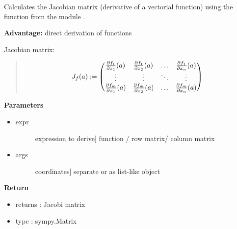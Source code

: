 \documentclass[letterpaper,10pt,english]{sphinxmanual}
\begin{document}
\begin{fulllineitems}
\label{pycontroltools:lietools.lietools.jac}
Calculates the Jacobian matrix (derivative of a vectorial function)
using the  function from the module
.

\textbf{Advantage:} direct derivation of functions

Jacobian matrix:
\begin{quote}
\begin{gather}
\begin{split}J_f(a) :=  \left(\begin{matrix} 
            \frac{\partial f_1}{\partial x_1}(a) &
            \frac{\partial f_1}{\partial x_2}(a) &
            \ldots &
            \frac{\partial f_1}{\partial x_n}(a)\\
            \vdots & \vdots & \ddots & \vdots \\
            \frac{\partial f_m}{\partial x_1}(a) &
            \frac{\partial f_m}{\partial x_2}(a) & \ldots &
            \frac{\partial f_m}{\partial x_n}(a)
            \end{matrix}\right)\end{split}\notag
\end{gather}\end{quote}

\textbf{Parameters}
\begin{itemize}
\item {} \begin{description}
\item[{expr}] \leavevmode{[}expression to derive{]}
function / row matrix/ column matrix

\end{description}

\item {} \begin{description}
\item[{args}] \leavevmode{[}coordinates{]}
separate or as list-like object

\end{description}

\end{itemize}

\textbf{Return}
\begin{itemize}
\item {} 
returns : Jacobi matrix

\item {} 
type : sympy.Matrix


\end{itemize}
\end{fulllineitems}
\end{document}
